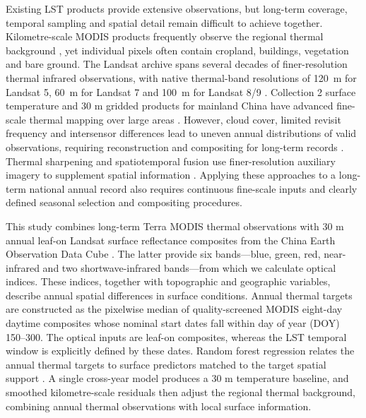 Existing LST products provide extensive observations, but long-term coverage, temporal sampling and spatial detail remain difficult to achieve together. Kilometre-scale MODIS products frequently observe the regional thermal background \parencite{wan2008modis,duan2019modisValidation}, yet individual pixels often contain cropland, buildings, vegetation and bare ground. The Landsat archive spans several decades of finer-resolution thermal infrared observations, with native thermal-band resolutions of 120~m for Landsat 5, 60~m for Landsat 7 and 100~m for Landsat 8/9 \parencite{wulder2022landsat50}. Collection 2 surface temperature and 30 m gridded products for mainland China have advanced fine-scale thermal mapping over large areas \parencite{malakar2018landsatSt,usgs2021collection2,cheng2021landsat30m}. However, cloud cover, limited revisit frequency and intersensor differences lead to uneven annual distributions of valid observations, requiring reconstruction and compositing for long-term records \parencite{fu2016consistent}. Thermal sharpening and spatiotemporal fusion use finer-resolution auxiliary imagery to supplement spatial information \parencite{agam2007sharpening,qi2026thermalGap}. Applying these approaches to a long-term national annual record also requires continuous fine-scale inputs and clearly defined seasonal selection and compositing procedures.

This study combines long-term Terra MODIS thermal observations with 30 m annual leaf-on Landsat surface reflectance composites from the China Earth Observation Data Cube \parencite{cai2025ceodc}. The latter provide six bands---blue, green, red, near-infrared and two shortwave-infrared bands---from which we calculate optical indices. These indices, together with topographic and geographic variables, describe annual spatial differences in surface conditions. Annual thermal targets are constructed as the pixelwise median of quality-screened MODIS eight-day daytime composites whose nominal start dates fall within day of year (DOY) 150--300. The optical inputs are leaf-on composites, whereas the LST temporal window is explicitly defined by these dates. Random forest regression relates the annual thermal targets to surface predictors matched to the target spatial support \parencite{hutengs2016rf,ebrahimy2021adaptive}. A single cross-year model produces a 30 m temperature baseline, and smoothed kilometre-scale residuals then adjust the regional thermal background, combining annual thermal observations with local surface information.

